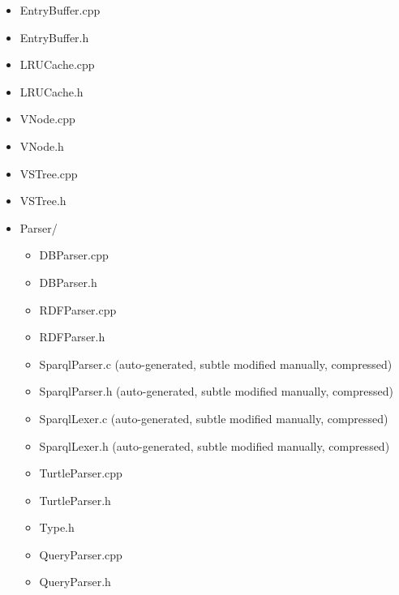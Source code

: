 \documentclass[titlepage, a4paper, 12pt]{article}
\begin{document}
\begin{itemize}
  \begin{itemize}
  \item
    EntryBuffer.cpp
  \item
    EntryBuffer.h
  \item
    LRUCache.cpp
  \item
    LRUCache.h
  \item
    VNode.cpp
  \item
    VNode.h
  \item
    VSTree.cpp
  \item
    VSTree.h
  \end{itemize}
\end{itemize}


\begin{itemize}
\item
  Parser/

  \begin{itemize}
  \item
    DBParser.cpp
  \item
    DBParser.h
  \item
    RDFParser.cpp
  \item
    RDFParser.h
  \item
    SparqlParser.c (auto-generated, subtle modified manually,
    compressed)
  \item
    SparqlParser.h (auto-generated, subtle modified manually,
    compressed)
  \item
    SparqlLexer.c (auto-generated, subtle modified manually, compressed)
  \item
    SparqlLexer.h (auto-generated, subtle modified manually, compressed)
  \item
    TurtleParser.cpp
  \item
    TurtleParser.h
  \item
    Type.h
  \item
    QueryParser.cpp
  \item
    QueryParser.h
  \end{itemize}
\end{itemize}

\end{document}
